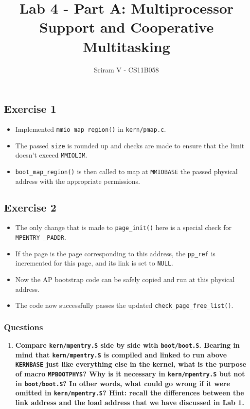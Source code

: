 \documentclass[]{article}
\title{Lab 4 - Part A: Multiprocessor Support and Cooperative Multitasking}
\author{Sriram V - CS11B058}
\date{}
\begin{document}
\maketitle

\subsection{Exercise 1}

\begin{itemize}
\itemsep1pt\parskip0pt
\item
  Implemented \texttt{mmio\_map\_region()} in \texttt{kern/pmap.c}.
\item
  The passed \texttt{size} is rounded up and checks are made to ensure
  that the limit doesn't exceed \texttt{MMIOLIM}.
\item
  \texttt{boot\_map\_region()} is then called to map at
  \texttt{MMIOBASE} the passed physical address with the appropriate
  permissions.
\end{itemize}

\subsection{Exercise 2}

\begin{itemize}
\itemsep1pt\parskip0pt
\item
  The only change that is made to \texttt{page\_init()} here is a
  special check for \texttt{MPENTRY \_PADDR}.
\item
  If the page is the page corresponding to this address, the
  \texttt{pp\_ref} is incremented for this page, and its link is set to
  \texttt{NULL}.
\item
  Now the AP bootstrap code can be safely copied and run at this
  physical address.
\item
  The code now successfully passes the updated
  \texttt{check\_page\_free\_list()}.
\end{itemize}

\subsubsection{Questions}

\begin{enumerate}
\def\labelenumi{\arabic{enumi}.}
\itemsep1pt\parskip0pt
\item
  \textbf{Compare \texttt{kern/mpentry.S} side by side with
  \texttt{boot/boot.S}. Bearing in mind that \texttt{kern/mpentry.S} is
  compiled and linked to run above \texttt{KERNBASE} just like
  everything else in the kernel, what is the purpose of macro
  \texttt{MPBOOTPHYS}? Why is it necessary in \texttt{kern/mpentry.S}
  but not in \texttt{boot/boot.S}? In other words, what could go wrong
  if it were omitted in \texttt{kern/mpentry.S}? Hint: recall the
  differences between the link address and the load address that we have
  discussed in Lab 1.}
\end{enumerate}
\end{document}
